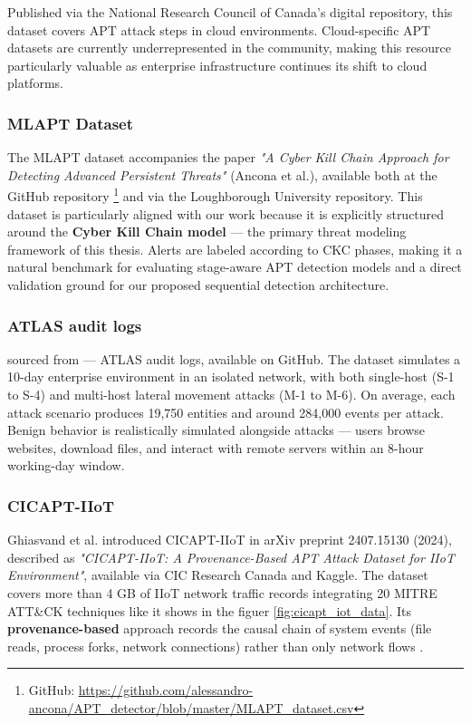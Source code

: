Published via the National Research Council of Canada's digital repository, this dataset covers APT attack steps in cloud environments. Cloud-specific APT datasets are currently underrepresented in the community, making this resource particularly valuable as enterprise infrastructure continues its shift to cloud platforms.

\subsubsection{MLAPT Dataset}

The MLAPT dataset accompanies the paper \textit{"A Cyber Kill Chain Approach for Detecting Advanced Persistent Threats"} (Ancona et al.), available both at the GitHub repository \footnote{GitHub: \url{https://github.com/alessandro-ancona/APT_detector/blob/master/MLAPT_dataset.csv}} and via the Loughborough University repository. This dataset is particularly aligned with our work because it is explicitly structured around the \textbf{Cyber Kill Chain model} --- the primary threat modeling framework of this thesis. Alerts are labeled according to CKC phases, making it a natural benchmark for evaluating stage-aware APT detection models and a direct validation ground for our proposed sequential detection architecture.

\subsubsection{ATLAS audit logs}

sourced from \cite{alsaheel2021atlas} — ATLAS audit logs, available on GitHub. The dataset simulates a 10-day enterprise environment in an isolated network, with both single-host (S-1 to S-4) and multi-host lateral movement attacks (M-1 to M-6). On average, each attack scenario produces 19,750 entities and around 284,000 events per attack. Benign behavior is realistically simulated alongside attacks — users browse websites, download files, and interact with remote servers within an 8-hour working-day window.

\subsubsection{CICAPT-IIoT}

Ghiasvand et al. \cite{ghiasvand2024cicapt} introduced CICAPT-IIoT in arXiv preprint 2407.15130 (2024), described as \textit{"CICAPT-IIoT: A Provenance-Based APT Attack Dataset for IIoT Environment"}, available via CIC Research Canada and Kaggle. The dataset covers more than 4 GB of IIoT network traffic records integrating 20 MITRE ATT\&CK techniques like it shows in the figuer \ref{fig:cicapt_iot_data}. Its \textbf{provenance-based} approach records the causal chain of system events (file reads, process forks, network connections) rather than only network flows .

